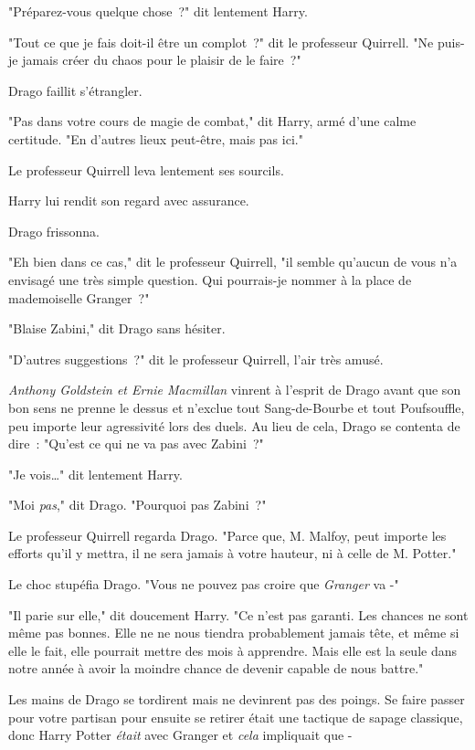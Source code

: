 "Préparez-vous quelque chose~?" dit lentement Harry.

"Tout ce que je fais doit-il être un complot~?" dit le professeur Quirrell. "Ne puis-je jamais créer du chaos pour le plaisir de le faire~?"

Drago faillit s'étrangler.

"Pas dans votre cours de magie de combat," dit Harry, armé d'une calme certitude. "En d'autres lieux peut-être, mais pas ici."

Le professeur Quirrell leva lentement ses sourcils.

Harry lui rendit son regard avec assurance.

Drago frissonna.

"Eh bien dans ce cas," dit le professeur Quirrell, "il semble qu'aucun de vous n'a envisagé une très simple question. Qui pourrais-je nommer à la place de mademoiselle Granger~?"

"Blaise Zabini," dit Drago sans hésiter.

"D'autres suggestions~?" dit le professeur Quirrell, l'air très amusé.

\emph{Anthony Goldstein et Ernie Macmillan} vinrent à l'esprit de Drago avant que son bon sens ne prenne le dessus et n'exclue tout Sang-de-Bourbe et tout Poufsouffle, peu importe leur agressivité lors des duels. Au lieu de cela, Drago se contenta de dire~: "Qu'est ce qui ne va pas avec Zabini~?"

"Je vois…" dit lentement Harry.

"Moi \emph{pas}," dit Drago. "Pourquoi pas Zabini~?"

Le professeur Quirrell regarda Drago. "Parce que, M. Malfoy, peut importe les efforts qu'il y mettra, il ne sera jamais à votre hauteur, ni à celle de M. Potter."

Le choc stupéfia Drago. "Vous ne pouvez pas croire que \emph{Granger} va -"

"Il parie sur elle," dit doucement Harry. "Ce n'est pas garanti. Les chances ne sont même pas bonnes. Elle ne ne nous tiendra probablement jamais tête, et même si elle le fait, elle pourrait mettre des mois à apprendre. Mais elle est la seule dans notre année à avoir la moindre chance de devenir capable de nous battre."

Les mains de Drago se tordirent mais ne devinrent pas des poings. Se faire passer pour votre partisan pour ensuite se retirer était une tactique de sapage classique, donc Harry Potter \emph{était} avec Granger et \emph{cela} impliquait que -

